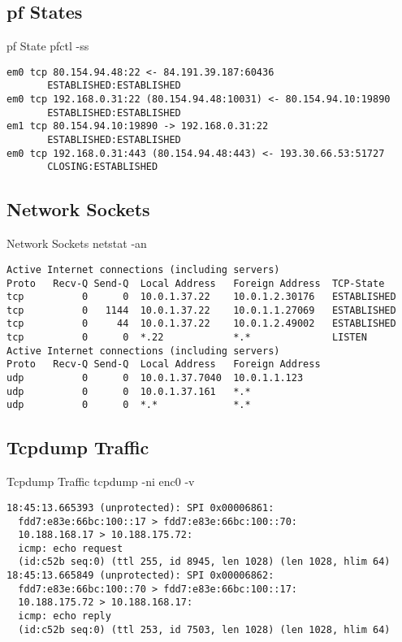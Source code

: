\documentclass[14pt]{beamer}
\begin{document}
\subsection{pf States}
\begin{frame}[fragile]{pf State}
pfctl -ss
\scriptsize
\begin{verbatim}
em0 tcp 80.154.94.48:22 <- 84.191.39.187:60436
       ESTABLISHED:ESTABLISHED
em0 tcp 192.168.0.31:22 (80.154.94.48:10031) <- 80.154.94.10:19890
       ESTABLISHED:ESTABLISHED
em1 tcp 80.154.94.10:19890 -> 192.168.0.31:22
       ESTABLISHED:ESTABLISHED
em0 tcp 192.168.0.31:443 (80.154.94.48:443) <- 193.30.66.53:51727
       CLOSING:ESTABLISHED
\end{verbatim}
\end{frame}

\subsection{Network Sockets}
\begin{frame}[fragile]{Network Sockets}
netstat -an
\scriptsize
\begin{verbatim}
Active Internet connections (including servers)
Proto   Recv-Q Send-Q  Local Address   Foreign Address  TCP-State
tcp          0      0  10.0.1.37.22    10.0.1.2.30176   ESTABLISHED
tcp          0   1144  10.0.1.37.22    10.0.1.1.27069   ESTABLISHED
tcp          0     44  10.0.1.37.22    10.0.1.2.49002   ESTABLISHED
tcp          0      0  *.22            *.*              LISTEN
Active Internet connections (including servers)
Proto   Recv-Q Send-Q  Local Address   Foreign Address
udp          0      0  10.0.1.37.7040  10.0.1.1.123
udp          0      0  10.0.1.37.161   *.*
udp          0      0  *.*             *.*
\end{verbatim}
\end{frame}

\subsection{Tcpdump Traffic}
\begin{frame}[fragile]{Tcpdump Traffic}
tcpdump -ni enc0 -v
\scriptsize
\begin{verbatim}
18:45:13.665393 (unprotected): SPI 0x00006861:
  fdd7:e83e:66bc:100::17 > fdd7:e83e:66bc:100::70:
  10.188.168.17 > 10.188.175.72:
  icmp: echo request
  (id:c52b seq:0) (ttl 255, id 8945, len 1028) (len 1028, hlim 64)
18:45:13.665849 (unprotected): SPI 0x00006862:
  fdd7:e83e:66bc:100::70 > fdd7:e83e:66bc:100::17:
  10.188.175.72 > 10.188.168.17:
  icmp: echo reply
  (id:c52b seq:0) (ttl 253, id 7503, len 1028) (len 1028, hlim 64)
\end{verbatim}
\end{frame}
\end{document}
